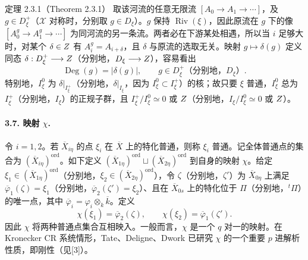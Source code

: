 \begin{originaltheorem}{定理 2.3.1（Theorem 2.3.1）}
取该河流的任意无限流 $[A_0\longrightarrow A_1\longrightarrow\cdots]$，及 $g\in D_\xi^+$（$\mathcal X$ 对称时，分别取 $g\in D_\xi$）。$g$ 保持 $\operatorname{Riv}(\xi)$，因此原流在 $g$ 下的像 $[A_0^g\longrightarrow A_1^g\longrightarrow\cdots]$ 为同河流的另一条流。两者必在下游某处相遇，所以当 $i$ 足够大时，对某个 $\delta\in Z$ 有 $A_i^g=A_{i+\delta}$，且 $\delta$ 与原流的选取无关。映射 $g\mapsto\delta(g)$ 定义同态 $\delta:D_\xi^+\longrightarrow Z$（分别地，$D_\xi\longrightarrow Z$），容易看出
\[
 \operatorname{Deg}(g)=|\delta(g)|,\qquad g\in D_\xi^+
 \text{（分别地，}D_\xi\text{）}.\tag{3.6.1}
\]
特别地，$I_\xi^0$ 为 $\delta|_{I_\xi^+}$（分别地，$\delta|_{I_\xi}$，因为 $I_\xi^0\subset I_\xi^+$）的核；故只要 $\xi$ 普通，$I_\xi^0$ 总为 $I_\xi^+$（分别地，$I_\xi$）的正规子群，且 $I_\xi^+/I_\xi^0\simeq0$ 或 $Z$（分别地，$I_\xi/I_\xi^0\simeq0$ 或 $Z$）。

\paragraph*{3.7. 映射 $\chi$.}
令 $i=1,2$。若 $\overline X_{i\eta}$ 的点 $\xi_i$ 在 $\overline X$ 上的特化普通，则称 $\xi_i$ 普通。记全体普通点的集合为 $(\overline X_{i\eta})^{\mathrm{ord}}$。如下定义
$(\overline X_{1\eta})^{\mathrm{ord}}\sqcup(\overline X_{2\eta})^{\mathrm{ord}}$ 到自身的映射 $\chi$。给定 $\xi_1\in(\overline X_{1\eta})^{\mathrm{ord}}$（分别地，$\xi_2\in(\overline X_{2\eta})^{\mathrm{ord}}$），令 $\zeta$（分别地，$\zeta'$）为 $\overline X_{0\eta}$ 上满足 $\overline\varphi_1(\zeta)=\xi_1$（分别地，$\overline\varphi_2(\zeta')=\xi_2$）、且在 $\overline X_{0s}$ 上的特化位于 $\Pi$（分别地，${}^t\Pi$）的唯一点，其中 $\overline\varphi_i=\varphi_i\otimes_k\overline k$。定义
\[
 \chi(\xi_1)=\overline\varphi_2(\zeta),\qquad
 \chi(\xi_2)=\overline\varphi_1(\zeta').
\]
因此 $\chi$ 将两种普通点集合互相映入。一般而言，$\chi$ 是一个 $q$ 对一的映射。在 Kronecker CR 系统情形，Tate、Deligne、Dwork 已研究 $\chi$ 的一个重要 $p$ 进解析性质，即刚性（见[3]）。


\end{originaltheorem}
